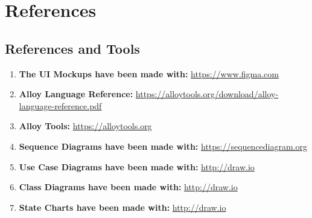 \documentclass{article}
\begin{document}
\section{References}
\subsection{References and Tools}
\begin{enumerate}
    \item \textbf{The UI Mockups have been made with:} \url{https://www.figma.com}
    \item \textbf{Alloy Language Reference:} \url{https://alloytools.org/download/alloy-language-reference.pdf}
    \item \textbf{Alloy Tools:} \url{https://alloytools.org}
    \item \textbf{Sequence Diagrams have been made with:} \url{https://sequencediagram.org}
    \item \textbf{Use Case Diagrams have been made with:} \url{http://draw.io}
    \item \textbf{Class Diagrams have been made with:} \url{http://draw.io}
    \item \textbf{State Charts have been made with:} \url{http://draw.io}
\end{enumerate}

\maketitle
\end{document}
